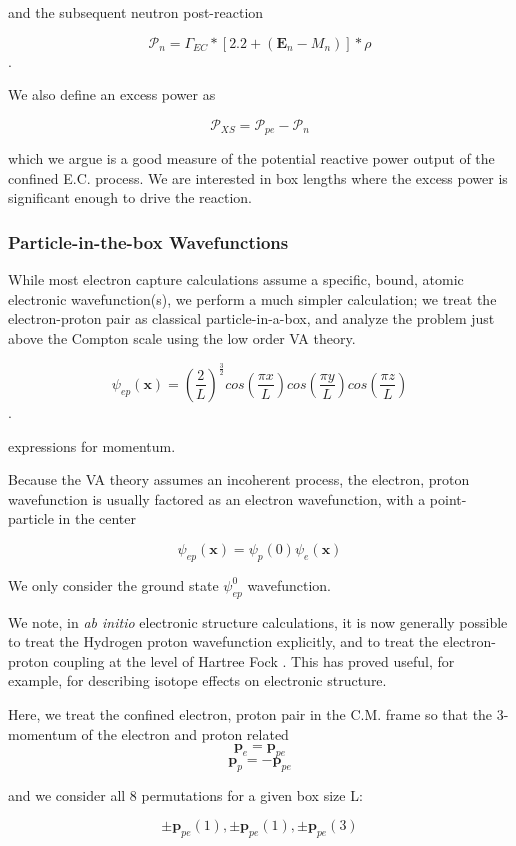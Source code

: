 \documentclass[%
 aip,
 jmp,%
 amsmath,amssymb,
 reprint,%
]{revtex4-1}
\begin{document}
and the subsequent neutron post-reaction

$$\mathcal{P}_{n}=\Gamma_{EC}*\left[2.2+(\mathbf{E}_{n}-M_{n})\right]*\rho$$.

We also define an excess power as

$$\mathcal{P}_{XS}=\mathcal{P}_{pe}-\mathcal{P}_{n}$$

which we argue is a good measure of the potential reactive power output of the confined E.C. process. We are interested in box lengths where the excess power is significant enough to drive the reaction.

\subsubsection{Particle-in-the-box Wavefunctions}

While most electron capture calculations assume a specific, bound, atomic electronic wavefunction(s), we perform a much simpler calculation; we treat the electron-proton pair as classical particle-in-a-box,  and analyze the problem just above the Compton scale using the low order VA theory.

$$\psi_{ep}(\mathbf{x})=\left(\dfrac{2}{L}\right)^{\frac{3}{2}}cos\left(\dfrac{\pi x}{L}\right)cos\left(\dfrac{\pi y}{L}\right)cos\left(\dfrac{\pi z}{L}\right)$$.

expressions for momentum.

Because the VA theory assumes an incoherent process, the electron, proton wavefunction is usually factored as an electron wavefunction, with a point-particle in the center

$$\psi_{ep}(\mathbf{x})=\psi_{p}(0)\psi_{e}(\mathbf{x})$$

We only consider the ground state $\psi_{ep}^{0}$ wavefunction.

We note, in \emph{ab initio} electronic structure calculations, it is now generally possible to treat the Hydrogen proton wavefunction explicitly, and to treat the electron-proton coupling at the level of Hartree Fock \cite{martin}.  This has proved useful, for example, for describing isotope effects on electronic structure.

Here, we treat the confined electron, proton pair in the C.M. frame so that the 3-momentum of the electron and proton related
$$\mathbf{p}_{e}=\mathbf{p}_{pe}$$
$$\mathbf{p}_{p}=-\mathbf{p}_{pe}$$

and we consider all 8 permutations for a given box size L:

$$\pm\mathbf{p}_{pe}(1), \pm\mathbf{p}_{pe}(1), \pm\mathbf{p}_{pe}(3)$$
\end{document}
